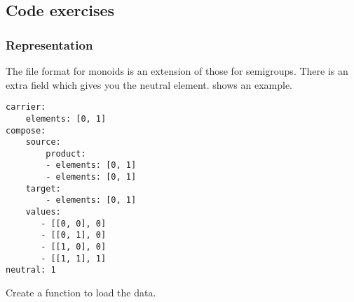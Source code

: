 
\subsection{Code exercises}






\subsubsection*{Representation}
%

The file format for monoids is an extension of those for semigroups.
There is an extra field  which gives you the neutral element.
 shows an example.

\begin{longcode}
  \caption{}
  \label{lst:monoid1}
  \begin{verbatim}
carrier:
    elements: [0, 1]
compose:
    source:
        product:
        - elements: [0, 1]
        - elements: [0, 1]
    target:
        - elements: [0, 1]
    values:
       - [[0, 0], 0]
       - [[0, 1], 0]
       - [[1, 0], 0]
       - [[1, 1], 1]
neutral: 1
  \end{verbatim}
\end{longcode}



\begin{gradedexercise}
  Create a function to load the data.
%
\end{gradedexercise}


